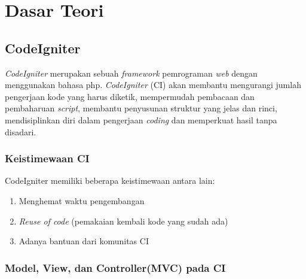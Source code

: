 \chapter{Dasar Teori}
\label{chap: dasarTeori}

\section{CodeIgniter}
\label{sec: codeigniter}

	\textit{CodeIgniter} merupakan sebuah \textit{framework} pemrograman \textit{web} dengan menggunakan bahasa php. \textit{CodeIgniter} (CI) akan membantu mengurangi jumlah pengerjaan kode yang harus diketik, mempermudah pembacaan dan pembaharuan \textit{script}, membantu penyusunan struktur yang jelas dan rinci, mendisiplinkan diri dalam pengerjaan \textit{coding} dan memperkuat hasil tanpa disadari.
	
	
	\subsection{Keistimewaan CI}
	\label{sub: KeistimewaanCI}
	CodeIgniter memiliki beberapa keistimewaan antara lain:
	\begin{enumerate}
		\item Menghemat waktu pengembangan
		\item \textit{Reuse of code} (pemakaian kembali kode yang sudah ada)
		\item Adanya bantuan dari komunitas CI
	\end{enumerate}	
	
	
	\subsection{Model, View, dan Controller(MVC) pada CI}
	\label{sub: mvc}
	
